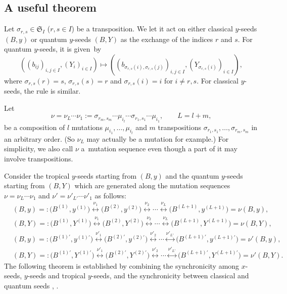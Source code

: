 \documentclass[11pt]{article}
\numberwithin{equation}{section}
\newcommand\bY{Y}
\numberwithin{equation}{section}
\begin{document}
\subsection{A useful theorem}

Let $\sigma_{r,s} \in \mathfrak{S}_I$ ($r, s \in I$) be a transposition.
We let it act on either classical $y$-seeds $(B,y)$ or quantum $y$-seeds $(B,Y)$
as the exchange of the indices $r$ and $s$. For quantum $y$-seeds, it
is given~by
\begin{equation}\label{qys}
((b_{ij})_{i,j\in I} , (Y_i)_{i \in I} ) \mapsto
((b_{\sigma_{r,s}(i), \sigma_{r,s}(j)})_{i,j\in I}, (Y_{\sigma_{r,s}(i)})_{i \in I} ),
\end{equation}
where $\sigma_{r,s}(r) = s$, $\sigma_{r,s}(s)=r$ and
$\sigma_{r,s}(i) = i$ for $i \neq r,s$. For classical $y$-seeds, the
rule is similar.

Let
\begin{equation}\label{nuL}
\nu = \nu_L\dotsm \nu_1 := \sigma_{r_m,s_m} \dotsm
\mu_{i_l} \dotsm \sigma_{r_1,s_1} \dotsm \mu_{i_1}, \qquad L = l+m,
\end{equation}
be a composition of $l$ mutations $\mu_{i_1}, \dots, \mu_{i_l}$ and
$m$ transpositions $\sigma_{r_1,s_1}, \dots, \sigma_{r_m, s_m}$ in
an arbitrary order. (So $\nu_L$ may actually be a mutation for
example.) For simplicity, we also call $\nu$ a~mutation sequence even
though a part of it may involve transpositions.

Consider the tropical $y$-seeds starting from $(B,y)$ and the quantum
$y$-seeds starting from $(B,Y)$ which are generated along the mutation
sequences $\nu=\nu_L\dotsm \nu_1$ and $\nu'= \nu'_{L'} \dotsm \nu'_1$
as follows:
\begin{align}%
\label{seq0}
&(B,y) =:\bigl(B^{(1)},y^{(1)}\bigr) \stackrel{\nu_1}{\longleftrightarrow}
\bigl(B^{(2)},y^{(2)}\bigr) \stackrel{\nu_2}{\longleftrightarrow}
\dotsb
\stackrel{\nu_L}{\longleftrightarrow} \bigl(B^{(L+1)},y^{(L+1)}\bigr) = \nu(B,y),
\\
&(B,\bY) =:\bigl(B^{(1)},\bY^{(1)}\bigr) \stackrel{\nu_1}{\longleftrightarrow}
\bigl(B^{(2)},\bY^{(2)}\bigr) \stackrel{\nu_2}{\longleftrightarrow}
\dotsb
\stackrel{\nu_L}{\longleftrightarrow} \bigl(B^{(L+1)},\bY^{(L+1)}\bigr) = \nu(B,Y),
\\
&(B,y) =:\bigl(B^{(1)\prime },y^{(1)\prime}\bigr) \stackrel{\nu'_1}{\longleftrightarrow}
\bigl(B^{(2)\prime},y^{(2)\prime}\bigr) \stackrel{\nu'_2}{\longleftrightarrow}
\dotsb
\stackrel{\nu'_{L'}}{\longleftrightarrow} \bigl(B^{(L+1)\prime},y^{(L+1)\prime}\bigr) = \nu'(B,y),
\\
&(B,\bY) =:\bigl(B^{(1)\prime},\bY^{(1)\prime}\bigr) \!\stackrel{\nu'_1}{\longleftrightarrow}\!
\bigl(B^{(2)\prime},\bY^{(2)\prime}\bigr) \!\stackrel{\nu'_2}{\longleftrightarrow}
\dotsb
\stackrel{\nu'_{L'}}{\longleftrightarrow} \!\bigl(B^{(L+1)\prime},\bY^{(L+1)\prime}\bigr) = \nu'(B,Y).\!\!\!
\label{seq3}
\end{align}
The following theorem is established by combining the synchronicity \cite{N21}
among $x$-seeds, $y$-seeds and tropical $y$-seeds,
and the synchronicity between classical and quantum seeds
\cite[Lemma 2.22]{FG09b}, \cite[Proposition~3.4]{KN11}.
\end{document}
